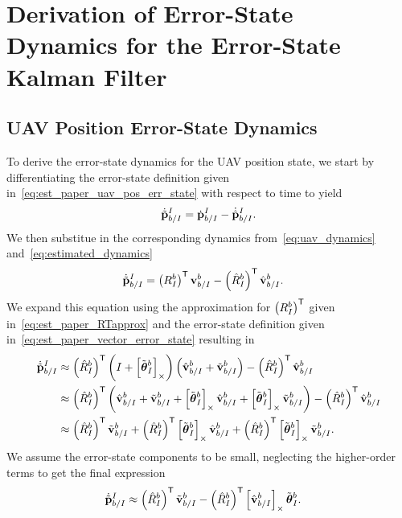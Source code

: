 \chapter{Derivation of Error-State Dynamics for the Error-State Kalman Filter}
\label{apdx:estimation_err_state_derivation}

\section{UAV Position Error-State Dynamics}
To derive the error-state dynamics for the UAV position state, we start by
differentiating the error-state definition given
in~\eqref{eq:est_paper_uav_pos_err_state} with respect to time to yield
\begin{equation}
  \dot{\tilde{\boldsymbol{\mathrm{p}}}}_{b/I}^I = \dot{\boldsymbol{\mathrm{p}}}_{b/I}^I - \dot{\hat{\boldsymbol{\mathrm{p}}}}_{b/I}^I.
\end{equation}
We then substitue in the corresponding dynamics from~\eqref{eq:uav_dynamics}
and~\eqref{eq:estimated_dynamics}
\begin{align}
  \dot{\tilde{\boldsymbol{\mathrm{p}}}}_{b/I}^I
  &=
  \left( R_I^b \right)^{\mathsf{T}} \boldsymbol{\mathrm{v}}_{b/I}^b
  - \left( \hat{R}_I^b \right)^{\mathsf{T}} \hat{\boldsymbol{\mathrm{v}}}_{b/I}^b.
\end{align}
We expand this equation using the approximation for $\left( R_I^b \right)^{\mathsf{T}}$ given
in~\eqref{eq:est_paper_RTapprox} and the error-state definition given
in~\eqref{eq:est_paper_vector_error_state} resulting in
\begin{align}
  \dot{\tilde{\boldsymbol{\mathrm{p}}}}_{b/I}^I
  &\approx
  \left( \hat{R}_I^b \right)^{\mathsf{T}}
  \left( I + \left[ \tilde{\boldsymbol{\mathrm{\theta}}}_I^b \right]_{\times} \right)
  \left( \hat{\boldsymbol{\mathrm{v}}}_{b/I}^b + \tilde{\boldsymbol{\mathrm{v}}}_{b/I}^b \right)
  - \left( \hat{R}_I^b \right)^{\mathsf{T}} \hat{\boldsymbol{\mathrm{v}}}_{b/I}^b \\
  &\approx
  \left( \hat{R}_I^b \right)^{\mathsf{T}}
  \left( \hat{\boldsymbol{\mathrm{v}}}_{b/I}^b + \tilde{\boldsymbol{\mathrm{v}}}_{b/I}^b
  + \left[ \tilde{\boldsymbol{\mathrm{\theta}}}_I^b \right]_{\times} \hat{\boldsymbol{\mathrm{v}}}_{b/I}^b
  + \left[ \tilde{\boldsymbol{\mathrm{\theta}}}_I^b \right]_{\times} \tilde{\boldsymbol{\mathrm{v}}}_{b/I}^b \right)
  - \left( \hat{R}_I^b \right)^{\mathsf{T}} \hat{\boldsymbol{\mathrm{v}}}_{b/I}^b \\
  &\approx
  \left( \hat{R}_I^b \right)^{\mathsf{T}} \tilde{\boldsymbol{\mathrm{v}}}_{b/I}^b
  + \left( \hat{R}_I^b \right)^{\mathsf{T}} \left[ \tilde{\boldsymbol{\mathrm{\theta}}}_I^b \right]_{\times} \hat{\boldsymbol{\mathrm{v}}}_{b/I}^b
  + \left( \hat{R}_I^b \right)^{\mathsf{T}} \left[ \tilde{\boldsymbol{\mathrm{\theta}}}_I^b \right]_{\times} \tilde{\boldsymbol{\mathrm{v}}}_{b/I}^b.
\end{align}
We assume the error-state components to be small, neglecting the higher-order
terms to get the final expression
\begin{align}
  \dot{\tilde{\boldsymbol{\mathrm{p}}}}_{b/I}^I
  &\approx
  \left( \hat{R}_I^b \right)^{\mathsf{T}} \tilde{\boldsymbol{\mathrm{v}}}_{b/I}^b
  - \left( \hat{R}_I^b \right)^{\mathsf{T}} \left[ \hat{\boldsymbol{\mathrm{v}}}_{b/I}^b \right]_{\times}
  \tilde{\boldsymbol{\mathrm{\theta}}}_I^b.
\end{align}

